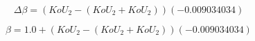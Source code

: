 \begin{equation}
    \Delta \beta = \left(KoU_{2} - \left(KoU_{2} + KoU_{2}\right)\right) \left(-0.009034034\right)
\end{equation}

\begin{equation}
    \beta = 1.0 + \left(KoU_{2} - \left(KoU_{2} + KoU_{2}\right)\right) \left(-0.009034034\right)
\end{equation}
